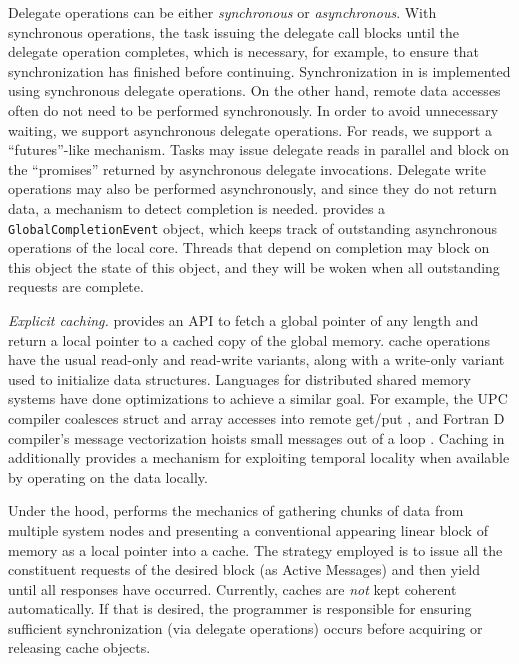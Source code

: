 Delegate operations can be either {\em synchronous} or {\em asynchronous}.
With synchronous operations, the task issuing the delegate call blocks until
the delegate operation completes, which is necessary, for example, to ensure
that synchronization has finished before continuing. Synchronization in \Grappa
is implemented using synchronous delegate operations. On the other hand, remote data
accesses often do not need to be performed synchronously. In order to avoid
unnecessary waiting, we support asynchronous delegate operations. For reads,
we support a ``futures''-like mechanism. Tasks may issue delegate reads in
parallel and block on the ``promises'' returned by asynchronous delegate
invocations. Delegate write operations may also be performed asynchronously,
and since they do not return data, a mechanism to detect completion is needed.
\Grappa provides a \texttt{GlobalCompletionEvent} object, which keeps track of
outstanding asynchronous operations of the local core. Threads that depend on completion may block on this object
the state of this object, and they will be woken when all outstanding requests are
complete. 

\vspace{1ex}
\textit{Explicit caching.} \Grappa provides an API to fetch a global pointer of
any length and return a local pointer to a cached copy of the global memory.
\Grappa cache operations have the usual read-only and read-write variants,
along with a write-only variant used to initialize data structures. Languages
for distributed shared memory systems have done optimizations to achieve a
similar goal. For example, the UPC compiler coalesces struct and array
accesses into remote get/put \cite{Chen:2005}, and Fortran D compiler's
message vectorization hoists small messages out of a loop
\cite{FortranD:1992}. Caching in \Grappa additionally provides a mechanism for
exploiting temporal locality when available by operating on the data locally.

Under the hood, \Grappa performs the mechanics of gathering chunks of data from
multiple system nodes and presenting a conventional appearing linear block of
memory as a local pointer into a cache. The strategy employed is to issue all
the constituent requests of the desired block (as Active Messages) and then
yield until all responses have occurred. Currently, \Grappa caches are
\emph{not\/} kept coherent automatically. If that is desired, the programmer is
responsible for ensuring sufficient synchronization (via delegate operations)
occurs before acquiring or releasing cache objects.

